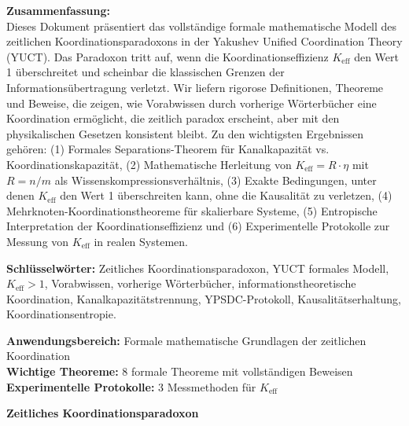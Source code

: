 \documentclass[12pt]{article}
\begin{document}
\begin{titlepage}
\begin{center}
			\newpage
			\vfill
			\normalsize
			\begin{minipage}{0.8\textwidth}
				\centering
				\textbf{Zusammenfassung:} \\ Dieses Dokument präsentiert das vollständige formale mathematische Modell des zeitlichen Koordinationsparadoxons in der Yakushev Unified Coordination Theory (YUCT). Das Paradoxon tritt auf, wenn die Koordinationseffizienz $K_{\text{eff}}$ den Wert 1 überschreitet und scheinbar die klassischen Grenzen der Informationsübertragung verletzt. Wir liefern rigorose Definitionen, Theoreme und Beweise, die zeigen, wie Vorabwissen durch vorherige Wörterbücher eine Koordination ermöglicht, die zeitlich paradox erscheint, aber mit den physikalischen Gesetzen konsistent bleibt. Zu den wichtigsten Ergebnissen gehören: (1) Formales Separations-Theorem für Kanalkapazität vs. Koordinationskapazität, (2) Mathematische Herleitung von $K_{\text{eff}} = R \cdot \eta$ mit $R = n/m$ als Wissenskompressionsverhältnis, (3) Exakte Bedingungen, unter denen $K_{\text{eff}}$ den Wert 1 überschreiten kann, ohne die Kausalität zu verletzen, (4) Mehrknoten-Koordinationstheoreme für skalierbare Systeme, (5) Entropische Interpretation der Koordinationseffizienz und (6) Experimentelle Protokolle zur Messung von $K_{\text{eff}}$ in realen Systemen.
			\end{minipage}
			
			\vspace{0.5cm}
			\normalsize
			\textbf{Schlüsselwörter:} Zeitliches Koordinationsparadoxon, YUCT formales Modell, $K_{\text{eff}} > 1$, Vorabwissen, vorherige Wörterbücher, informationstheoretische Koordination, Kanalkapazitätstrennung, YPSDC-Protokoll, Kausalitätserhaltung, Koordinationsentropie.
			
			\vspace{0cm}
			\normalsize
			
			\textbf{Anwendungsbereich:} Formale mathematische Grundlagen der zeitlichen Koordination \\
			\textbf{Wichtige Theoreme:} 8 formale Theoreme mit vollständigen Beweisen \\
			\textbf{Experimentelle Protokolle:} 3 Messmethoden für $K_{\text{eff}}$ \\
			
			\vspace{0.5cm}
			\normalsize
			
		\end{center}
	\end{titlepage}	
	\begin{center}
		\vspace*{0.5cm}
		\Huge\textbf{Zeitliches Koordinationsparadoxon}
		\vspace{1cm}
	\end{center}
	
\end{document}
